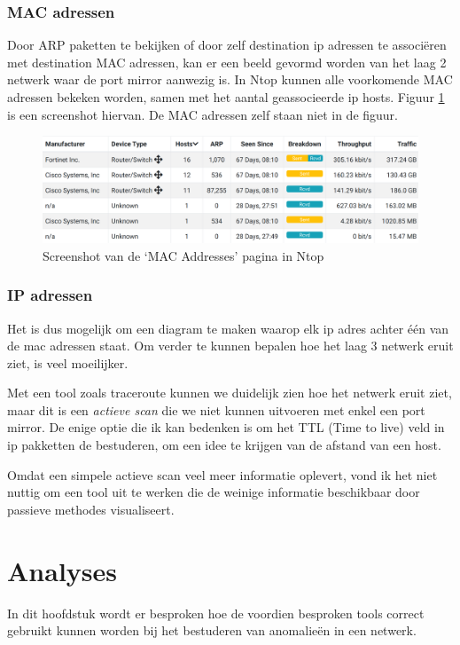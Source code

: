 \documentclass[a4paper,12pt]{report}
\begin{document}
\subsection{MAC adressen}
Door ARP paketten te bekijken of door zelf destination ip adressen te associëren met destination MAC adressen, kan er een beeld gevormd worden van het laag 2 netwerk waar de port mirror aanwezig is.
In Ntop kunnen alle voorkomende MAC adressen bekeken worden, samen met het aantal geassocieerde ip hosts.
Figuur \ref{fig:visualisatie-netwerk-layout-ntop-mac} is een screenshot hiervan.
De MAC adressen zelf staan niet in de figuur.

\begin{figure}[H]
  \centering
  \includegraphics[width=\textwidth]{visualisatie-netwerk-layout-ntop-mac}
  \caption{Screenshot van de `MAC Addresses' pagina in Ntop}
  \label{fig:visualisatie-netwerk-layout-ntop-mac}
\end{figure}

\subsection{IP adressen}
Het is dus mogelijk om een diagram te maken waarop elk ip adres achter één van de mac adressen staat.
Om verder te kunnen bepalen hoe het laag 3 netwerk eruit ziet, is veel moeilijker.

Met een tool zoals traceroute kunnen we duidelijk zien hoe het netwerk eruit ziet, maar dit is een \emph{actieve scan} die we niet kunnen uitvoeren met enkel een port mirror.
De enige optie die ik kan bedenken is om het TTL (Time to live) veld in ip pakketten de bestuderen, om een idee te krijgen van de afstand van een host.

Omdat een simpele actieve scan veel meer informatie oplevert, vond ik het niet nuttig om een tool uit te werken die de weinige informatie beschikbaar door passieve methodes visualiseert.

\chapter{Analyses}
In dit hoofdstuk wordt er besproken hoe de voordien besproken tools correct gebruikt kunnen worden bij het bestuderen van anomalieën in een netwerk.
\end{document}
